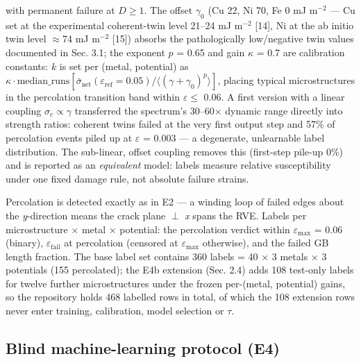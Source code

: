 \documentclass[11pt]{article}
\begin{document}
with permanent failure at $D \ge 1$. The offset $\gamma_0$ (Cu 22, Ni 70, Fe 0 mJ m$^{-2}$ --- Cu set at the experimental coherent-twin level 21--24 mJ m$^{-2}$ [14], Ni at the ab initio twin level $\approx$74 mJ m$^{-2}$ [15]) absorbs the pathologically low/negative twin values documented in Sec. 3.1; the exponent $p$ = 0.65 and gain $\kappa$ = 0.7 are calibration constants: $k$ is set per (metal, potential) as $\kappa \cdot \mathrm{median\_runs}[\bar{\sigma}_{\mathrm{net}}(\varepsilon_{\mathrm{ref}} = 0.05) / \langle(\gamma+\gamma_0)^{p}\rangle]$, placing typical microstructures in the percolation transition band within $\varepsilon \le$ 0.06. A first version with a linear coupling $\sigma_{c} \propto \gamma$ transferred the spectrum's 30--60$\times$ dynamic range directly into strength ratios: coherent twins failed at the very first output step and 57\% of percolation events piled up at $\varepsilon$ = 0.003 --- a degenerate, unlearnable label distribution. The sub-linear, offset coupling removes this (first-step pile-up 0\%) and is reported as an \textit{equivalent} model: labels measure relative susceptibility under one fixed damage rule, not absolute failure strains.

Percolation is detected exactly as in E2 --- a winding loop of failed edges about the \textit{y}-direction means the crack plane $\perp$ \textit{x} spans the RVE. Labels per microstructure $\times$ metal $\times$ potential: the percolation verdict within $\varepsilon_{\max}$ = 0.06 (binary), $\varepsilon_{\mathrm{fail}}$ at percolation (censored at $\varepsilon_{\max}$ otherwise), and the failed GB length fraction. The base label set contains 360 labels = 40 $\times$ 3 metals $\times$ 3 potentials (155 percolated); the E4b extension (Sec. 2.4) adds 108 test-only labels for twelve further microstructures under the frozen per-(metal, potential) gains, so the repository holds 468 labelled rows in total, of which the 108 extension rows never enter training, calibration, model selection or $\tau$.

\subsection{Blind machine-learning protocol (E4)}
\end{document}
